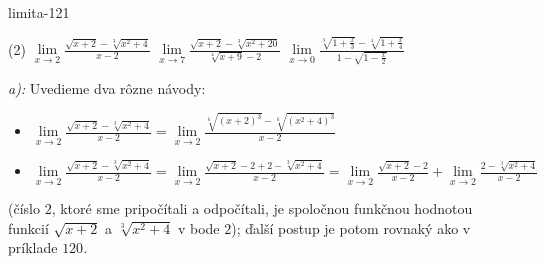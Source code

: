 \begin{defproblem}{limita-121}
\begin{tasks}(2)
\task $\lim\limits_{x \rightarrow 2} \frac{\sqrt{x+2}-\sqrt[3]{x^2+4}}{x-2}$
\task $\lim\limits_{x \rightarrow 7} \frac{\sqrt{x+2}-\sqrt[3]{x^2+20}}{\sqrt[4]{x+9}-2}$
\task $\lim\limits_{x \rightarrow 0} \frac{\sqrt[3]{1+\frac{x}{3}}-\sqrt[4]{1+\frac{x}{4}}}{1-\sqrt{1-\frac{x}{2}}}$
\end{tasks}

\begin{solution}
    \textit{a):}
    Uvedieme dva rôzne návody:
    \begin{itemize}
    \item $
        \lim\limits_{x \rightarrow 2} \frac{\sqrt{x+2}-\sqrt[3]{x^2+4}}{x-2}
        =\lim\limits_{x \rightarrow 2} \frac{\sqrt[6]{(x+2)^3}
            - \sqrt[6]{(x^2+4)^3}}{x-2}
    $
    \item $
        \lim\limits_{x \rightarrow 2} \frac{\sqrt{x+2}-\sqrt[3]{x^2+4}}{x-2}
        = \lim\limits_{x \rightarrow 2} \frac{\sqrt{x+2}-2+2-\sqrt[3]{x^2+4}}{x-2}
        = \lim\limits_{x \rightarrow 2} \frac{\sqrt{x+2}-2}{x-2}
            +\lim\limits_{x \rightarrow 2} \frac{2-\sqrt[3]{x^2+4}}{x-2}
    $
    \end{itemize}

    (číslo $2$, ktoré sme pripočítali a odpočítali, je spoločnou funkčnou
    hodnotou funkcií $\sqrt{x+2}$ a $\sqrt[3]{x^2+4}$ v bode $2$); ďalší postup
    je potom rovnaký ako v príklade $120$.
\end{solution}
\end{defproblem}

